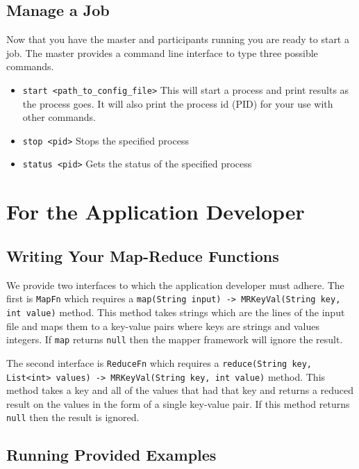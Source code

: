 \documentclass[12pt]{article}
\newcommand{\ttt}{\texttt}
\begin{document}
\subsection{Manage a Job}

Now that you have the master and participants running you are ready to start a job. The master provides a command line interface to type three possible commands.

\begin{itemize}
\item
\ttt{start <path\_to\_config\_file>} This will start a process and print results as the process goes. It will also print the process id (PID) for your use with other commands.

\item
\ttt{stop <pid>} Stops the specified process

\item
\ttt{status <pid>} Gets the status of the specified process

\end{itemize}

\section{For the Application Developer}

\subsection{Writing Your Map-Reduce Functions}

We provide two interfaces to which the application developer must adhere. The first is \ttt{MapFn} which requires a \ttt{map(String input) -> MRKeyVal(String key, int value)} method. This method takes strings which are the lines of the input file and maps them to a key-value pairs where keys are strings and values integers. If \ttt{map} returns \ttt{null} then the mapper framework will ignore the result.

The second interface is \ttt{ReduceFn} which requires a \ttt{reduce(String key, List<int> values) -> MRKeyVal(String key, int value)} method. This method takes a key and all of the values that had that key and returns a reduced result on the values in the form of a single key-value pair. If this method returns \ttt{null} then the result is ignored.

\subsection{Running Provided Examples}
\end{document}
